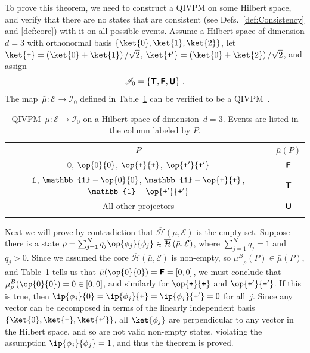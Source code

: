 \documentclass[english,reprint, aps, prl,superscriptaddress, showpacs,
showkeys, longbibliography, amsmath, amssymb, floatfix]{revtex4-1}
\theoremstyle{plain}
\theoremstyle{definition}
\newcommand{\Hilb}{\mathcal{H}}
\newcommand{\events}{\ensuremath{\mathcal{E}}}
\newcommand{\interval}[1]{{\normalfont\textsf{\textbf{#1}}}}
\newcommand{\imposs}{\interval{F}}
\newcommand{\necess}{\interval{T}}
\newcommand{\unknown}{\interval{U}}
\newcommand{\proj}[1]{\op{#1}{#1}}
\newcommand{\ps}{\texttt{+}}
\newcommand{\coreBorn}{\ensuremath{\overline{\Hilb}}}
\newcommand{\muB}{\ensuremath{\mu^{B}}}
\begin{document}
To prove this theorem, we need to construct a QIVPM on some Hilbert
space, and verify that there are no states that are consistent {\color{red}(see
Defs.~\ref{def:Consistency} and \ref{def:core})} with it
on all possible events. Assume a Hilbert space of dimension $d=3$ with
orthonormal basis $\left\{ \ket{0},\ket{1},\ket{2}\right\} $, let
$\ket{\ps}=\left(\ket{0}+\ket{1}\right)/\sqrt{2}$,
$\ket{\ps'}=\left(\ket{0}+\ket{2}\right)/\sqrt{2}$, and {\color{red}assign}
\begin{equation}
\mathscr{I}_{0}=\left\{ \necess,\imposs,\unknown\right\} \,.\label{eq:3-value-intervals}
\end{equation}
The map~$\bar{\mu}:\events\rightarrow\mathscr{I}_{0}$ defined in
Table~\ref{tab:non-Born-QIVPM} can be verified to be a
QIVPM~\cite{TaiThesis2018}.
\begin{table}
\caption{\label{tab:non-Born-QIVPM}QIVPM~$\bar{\mu}:\events\rightarrow\mathscr{I}_{0}$
on a Hilbert space of dimension~$d=3$. Events are listed in the column
labeled by $P$.}

\begin{tabular}{cc}
\toprule 
\addlinespace
$P$ & $\bar{\mu}\left(P\right)$\tabularnewline\addlinespace
\midrule
\midrule 
\addlinespace
$\mathbb{0}$, $\proj{0}$, $\proj{\ps}$, $\proj{\ps'}$ & $\imposs$\tabularnewline\addlinespace
\midrule 
\addlinespace
$\mathbb{1}$, $\mathbb{1}-\proj{0}$, $\mathbb{1}-\proj{\ps}$, 
$\mathbb{1}-\proj{\ps'}$ & $\necess$\tabularnewline\addlinespace
\midrule 
\addlinespace
All other projectors & $\unknown$\tabularnewline\addlinespace
\bottomrule
\end{tabular}
\end{table}
Next we will prove by contradiction that
$\coreBorn\left(\bar{\mu},\events\right)$ is the empty set. Suppose
there is a state
$\rho=\sum_{j=1}^{N}q_{j}\proj{\phi_{j}}\in\coreBorn\left(\bar{\mu},\events\right)$,
where $\sum_{j=1}^{N}q_{j}=1$ and $q_{j} > 0$. Since
we assumed the core $\coreBorn\left(\bar{\mu},\events\right)$ 
is non-empty, so  $\muB_{\rho}(P)\in\bar{\mu}(P)$, and 
Table~\ref{tab:non-Born-QIVPM} tells us that
$\bar{\mu}(\proj{0})=\imposs=[0,0]$, we must conclude that
$\muB_{\rho}(\proj{0})=0\in[0,0]$, and similarly for $\proj{\ps}$ and $\proj{\ps'}$.
If this is true, then $\ip{\phi_{j}}{0}=\ip{\phi_{j}}{\ps}=\ip{\phi_{j}}{\ps'}=0$
for all~$j$. {\color{red}Since any vector can be decomposed in terms of the
linearly independent basis $\left\{\ket{0},\ket{\ps},\ket{\ps'}\right\}$, all
$\ket{\phi_{j}}$ are perpendicular to any vector in the Hilbert space, and so
are not valid non-empty states, violating the assumption
$\ip{\phi_{j}}{\phi_{j}}=1$, and thus the theorem is proved.}
\end{document}
